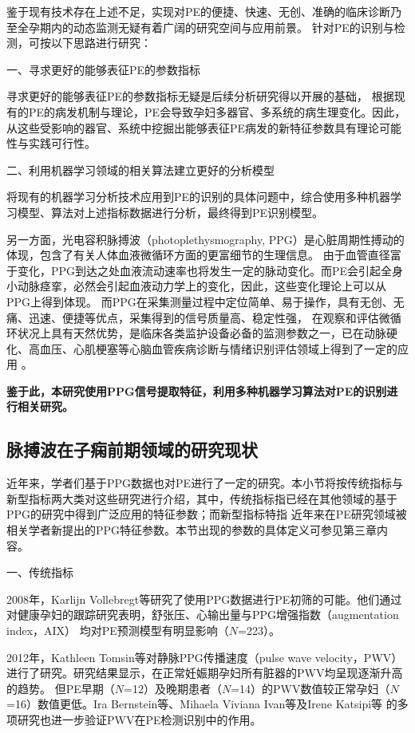 鉴于现有技术存在上述不足，实现对PE的便捷、快速、无创、准确的临床诊断乃至全孕期内的动态监测无疑有着广阔的研究空间与应用前景。
针对PE的识别与检测，可按以下思路进行研究：

一、寻求更好的能够表征PE的参数指标

寻求更好的能够表征PE的参数指标无疑是后续分析研究得以开展的基础，
根据现有的PE的病发机制与理论，PE会导致孕妇多器官、多系统的病生理变化。因此，从这些受影响的器官、系统中挖掘出能够表征PE病发的新特征参数具有理论可能性与实践可行性。

二、利用机器学习领域的相关算法建立更好的分析模型

将现有的机器学习分析技术应用到PE的识别的具体问题中，综合使用多种机器学习模型、算法对上述指标数据进行分析，最终得到PE识别模型。

另一方面，光电容积脉搏波（photoplethysmography, PPG）是心脏周期性搏动的体现，包含了有关人体血液微循环方面的更富细节的生理信息\cite{PPGYY}。
由于血管直径富于变化，PPG到达之处血液流动速率也将发生一定的脉动变化。而PE会引起全身小动脉痉挛，必然会引起血液动力学上的变化，因此，这些变化理论上可以从PPG上得到体现。
而PPG在采集测量过程中定位简单、易于操作，具有无创、无痛、迅速、便捷等优点，采集得到的信号质量高、稳定性强，
在观察和评估微循环状况上具有天然优势，是临床各类监护设备必备的监测参数之一，已在动脉硬化、高血压、心肌梗塞等心脑血管疾病诊断与情绪识别评估领域上得到了一定的应用
\cite{PPGYY,Allen2007,THOCBPM,Zhang2010,Hamilton1997,Chen2020}。

\textbf{鉴于此，本研究使用PPG信号提取特征，利用多种机器学习算法对PE的识别进行相关研究。}

\subsection{脉搏波在子痫前期领域的研究现状}
近年来，学者们基于PPG数据也对PE进行了一定的研究。本小节将按传统指标与新型指标两大类对这些研究进行介绍，其中，传统指标指已经在其他领域的基于PPG的研究中得到广泛应用的特征参数；而新型指标特指
近年来在PE研究领域被相关学者新提出的PPG特征参数。本节出现的参数的具体定义可参见第三章内容。

一、传统指标

2008年，Karlijn Vollebregt等\cite{KARLIJN2008}研究了使用PPG数据进行PE初筛的可能。他们通过对健康孕妇的跟踪研究表明，舒张压、心输出量与PPG增强指数（augmentation index，AIX）
均对PE预测模型有明显影响（$N$=223）。

2012年，Kathleen Tomsin等\cite{Tomsin2012}对静脉PPG传播速度（pulse wave velocity，PWV）进行了研究。研究结果显示，在正常妊娠期孕妇所有脏器的PWV均呈现逐渐升高的趋势。
但PE早期（$N$=12）及晚期患者（$N$=14）的PWV数值较正常孕妇（$N$=16）数值更低。Ira Bernstein等\cite{Ira2014}、Mihaela Viviana Ivan等\cite{VivianaIvan2018}及Irene Katsipi等\cite{Katsipi2014}
的多项研究也进一步验证PWV在PE检测识别中的作用。

